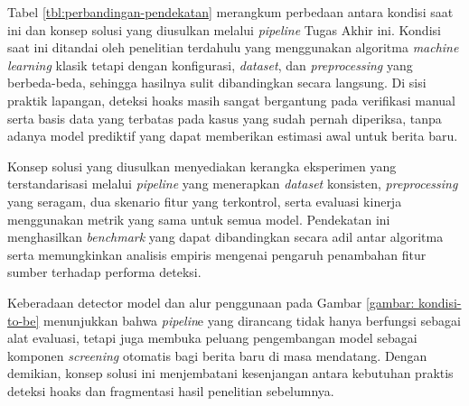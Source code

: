 Tabel \ref{tbl:perbandingan-pendekatan} merangkum perbedaan antara kondisi saat ini dan konsep solusi yang diusulkan melalui \textit{pipeline} Tugas Akhir ini. Kondisi saat ini ditandai oleh penelitian terdahulu yang menggunakan algoritma \textit{machine learning} klasik tetapi dengan konfigurasi, \textit{dataset}, dan \textit{preprocessing} yang berbeda-beda, sehingga hasilnya sulit dibandingkan secara langsung. Di sisi praktik lapangan, deteksi hoaks masih sangat bergantung pada verifikasi manual serta basis data yang terbatas pada kasus yang sudah pernah diperiksa, tanpa adanya model prediktif yang dapat memberikan estimasi awal untuk berita baru.

Konsep solusi yang diusulkan menyediakan kerangka eksperimen yang terstandarisasi melalui \textit{pipeline} yang menerapkan \textit{dataset} konsisten, \textit{preprocessing} yang seragam, dua skenario fitur yang terkontrol, serta evaluasi kinerja menggunakan metrik yang sama untuk semua model. Pendekatan ini menghasilkan \textit{benchmark} yang dapat dibandingkan secara adil antar algoritma serta memungkinkan analisis empiris mengenai pengaruh penambahan fitur sumber terhadap performa deteksi.

Keberadaan detector model dan alur penggunaan pada Gambar \ref{gambar: kondisi-to-be} menunjukkan bahwa \textit{pipelin}e yang dirancang tidak hanya berfungsi sebagai alat evaluasi, tetapi juga membuka peluang pengembangan model sebagai komponen \textit{screening} otomatis bagi berita baru di masa mendatang. Dengan demikian, konsep solusi ini menjembatani kesenjangan antara kebutuhan praktis deteksi hoaks dan fragmentasi hasil penelitian sebelumnya.